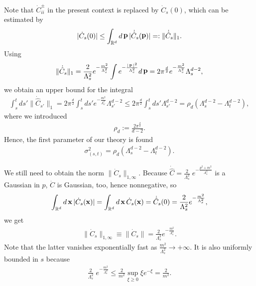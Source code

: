 \documentclass[12pt,twoside]{amsart}
\newcommand{\beq}{\begin{equation}}
\newcommand{\eeq}{\end{equation}}
\numberwithin{equation}{section}
\DeclareMathOperator{\pp}{{\bf{p}}}
\DeclareMathOperator{\xx}{{\bf{x}}}
\begin{document}
Note that $\dot{C}_{ii}^{\pm}$ in the present context is replaced by $\dot{C}_{s}(0)$, which can be estimated by
\begin{eqnarray}
|\dot{C}_{s}(0)| \le \int_{\mathbb{R}^{d}}d\pp |\dot{\hat{C}}_{s}(\pp)| =: \|\dot{\hat{C}}_{s}\|_{1}. \label{PHI4.8}
\end{eqnarray}
Using 
\begin{eqnarray}
\|\dot{\hat{C}}_{s}\|_{1} = \frac{2}{\Lambda_{s}^{2}}e^{-\frac{m^{2}}{\Lambda_{s}^{2}}}\int e^{-\frac{|\pp|^{2}}{\Lambda_{s}^{2}}}d\pp = 2\pi^{\frac{d}{2}}e^{-\frac{m^{2}}{\Lambda_{s}^{2}}}\Lambda_{s}^{d-2}, \label{PHI4.9}
\end{eqnarray}
we obtain an upper bound for the integral
\begin{eqnarray}
\int_{s}^{t}ds' \|\dot{\hat{C}}_{s'}\|_{1} = 2\pi^{\frac{d}{2}}\int_{s}^{t}ds'e^{-\frac{m^{2}}{\Lambda_{s'}^{2}}}\Lambda_{s'}^{d-2} \le 2\pi^{\frac{d}{2}}\int_{s}^{t}ds'\Lambda_{s'}^{d-2} = \rho_{d}(\Lambda_{s}^{d-2}-\Lambda_{t}^{d-2}), \label{PHI4.10}
\end{eqnarray}
where we introduced
\begin{eqnarray}
\rho_{d} := \frac{2\pi^{\frac{d}{2}}}{d-2}. \label{PHI4.11}
\end{eqnarray}
Hence, the first parameter of our theory is found
\begin{eqnarray}
\sigma_{(s,t)}^{2} = \rho_{d}(\Lambda_{s}^{d-2}-\Lambda_{t}^{d-2}). \label{PHI4.12}
\end{eqnarray}

We still need to obtain the norm $\|\dot{C}_{s}\|_{1,\infty}$. Because $\dot{\hat{C}} = \frac{2}{\Lambda_s^2}\; e^{- \frac{p^2 + m^2}{\Lambda_s^2} }$ is a Gaussian in $p$, $\dot C$ is Gaussian, too, hence nonnegative, so
\beq
\int_{\mathbb{R}^{d}}d\xx |\dot{C}_{s}(\xx)| = 
\int_{\mathbb{R}^{d}}d\xx \dot{C}_{s}(\xx) =
\dot{\hat{C}}_{s}(0) = \frac{2}{\Lambda_{s}^2}e^{-\frac{m^{2}}{\Lambda_{s}^{2}}}, \label{PHI4.13}
\eeq
we get
\begin{eqnarray}
\|\dot{C}_{s}\|_{1,\infty} \equiv \|\dot{C}_{s}\| = \frac{2}{\Lambda_{s}^2}e^{-\frac{m^{2}}{\Lambda_{s}^{2}}}. \label{PHI4.14}
\end{eqnarray}
Note that the latter vanishes exponentially fast as $\frac{m^{2}}{\Lambda_{s}^{2}} \to +\infty$. It is also uniformly bounded in $s$ because
\begin{eqnarray}
\frac{2}{\Lambda_{s}^2} \; e^{-\frac{m^{2}}{\Lambda_{s}^{2}}} \le \frac{2}{m^{2}}\sup_{\xi \ge 0}\xi e^{-\xi} = \frac{2}{m^{2}}.\label{PHI4.15}
\end{eqnarray}
\end{document}
